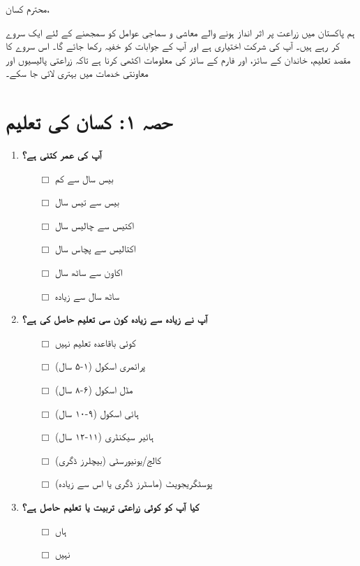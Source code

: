 \documentclass[12pt]{article}
\begin{document}
\begin{urdu}
محترم کسان،

ہم پاکستان میں زراعت پر اثر انداز ہونے والے معاشی و سماجی عوامل کو سمجھنے کے لئے ایک سروے کر رہے ہیں۔ آپ کی شرکت اختیاری ہے اور آپ کے جوابات کو خفیہ رکھا جائے گا۔ اس سروے کا مقصد تعلیم، خاندان کے سائز، اور فارم کے سائز کی معلومات اکٹھی کرنا ہے تاکہ زراعتی پالیسیوں اور معاونتی خدمات میں بہتری لائی جا سکے۔

\section*{حصہ ۱: کسان کی تعلیم}

\begin{enumerate}[label=\arabic*.]
    \item \textbf{آپ کی عمر کتنی ہے؟}
    \begin{itemize}
        \item [$\Box$] بیس سال سے کم
        \item [$\Box$] بیس سے تیس سال
        \item [$\Box$] اکتیس سے چالیس سال
        \item [$\Box$] اکتالیس سے پچاس سال
        \item [$\Box$] اکاون سے ساٹھ سال
        \item [$\Box$] ساٹھ سال سے زیادہ
    \end{itemize}
    \item \textbf{آپ نے زیادہ سے زیادہ کون سی تعلیم حاصل کی ہے؟}
    \begin{itemize}
        \item [$\Box$] کوئی باقاعدہ تعلیم نہیں
        \item [$\Box$] پرائمری اسکول (۱-۵ سال)
        \item [$\Box$] مڈل اسکول (۶-۸ سال)
        \item [$\Box$] ہائی اسکول (۹-۱۰ سال)
        \item [$\Box$] ہائیر سیکنڈری (۱۱-۱۲ سال)
        \item [$\Box$] کالج/یونیورسٹی (بیچلرز ڈگری)
        \item [$\Box$] پوسٹگریجویٹ (ماسٹرز ڈگری یا اس سے زیادہ)
    \end{itemize}
    \item \textbf{کیا آپ کو کوئی زراعتی تربیت یا تعلیم حاصل ہے؟}
    \begin{itemize}
        \item [$\Box$] ہاں
        \item [$\Box$] نہیں
    \end{itemize}

\end{enumerate}
\end{urdu}
\end{document}
